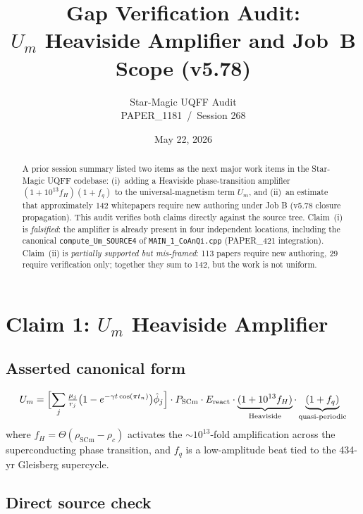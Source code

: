 \documentclass[11pt]{article}
\title{Gap Verification Audit: \\
  $U_m$ Heaviside Amplifier and Job~B Scope (v5.78)}
\author{Star-Magic UQFF Audit \\ PAPER\_1181 \,/\, Session 268}
\date{May 22, 2026}
\begin{document}
\maketitle

\begin{abstract}
A prior session summary listed two items as the next major work
items in the Star-Magic UQFF codebase:
(i)~adding a Heaviside phase-transition amplifier
$(1+10^{13}f_H)(1+f_q)$ to the universal-magnetism term $U_m$,
and (ii)~an estimate that approximately 142 whitepapers require
new authoring under Job B (v5.78 closure propagation). This audit
verifies both claims directly against the source tree. Claim~(i)
is \emph{falsified}: the amplifier is already present in four
independent locations, including the canonical
\verb|compute_Um_SOURCE4| of \verb|MAIN_1_CoAnQi.cpp|
(PAPER\_421 integration). Claim~(ii) is \emph{partially supported
but mis-framed}: 113 papers require new authoring, 29 require
verification only; together they sum to 142, but the work is not
uniform.
\end{abstract}

\section{Claim 1: $U_m$ Heaviside Amplifier}

\subsection{Asserted canonical form}

\begin{equation}
U_m
= \Bigl[\sum_j \tfrac{\mu_j}{r_j}\bigl(1-e^{-\gamma t\cos(\pi t_n)}\bigr)\hat\phi_j\Bigr]
   \cdot P_{\mathrm{SCm}}\cdot E_{\mathrm{react}}
   \cdot \underbrace{(1+10^{13}f_H)}_{\text{Heaviside}}
   \cdot \underbrace{(1+f_q)}_{\text{quasi-periodic}}
\end{equation}
where $f_H=\Theta(\rho_{\mathrm{SCm}}-\rho_c)$ activates the
$\sim 10^{13}$-fold amplification across the superconducting
phase transition, and $f_q$ is a low-amplitude beat tied to the
434-yr Gleisberg supercycle.

\subsection{Direct source check}
\end{document}
